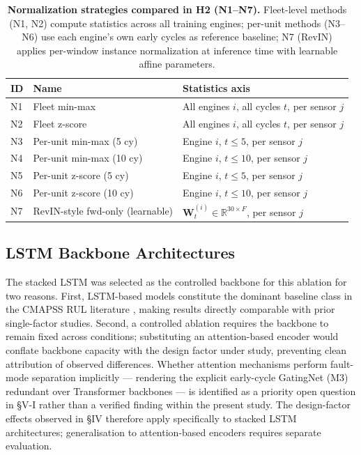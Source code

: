 \documentclass[preprint,10pt]{elsarticle}
\begin{document}
\begin{table}[!t]
\centering
\small
\caption*{\textbf{Normalization strategies compared in H2 (N1--N7).} Fleet-level methods (N1, N2) compute statistics across all training engines; per-unit methods (N3--N6) use each engine's own early cycles as reference baseline; N7 (RevIN) applies per-window instance normalization at inference time with learnable affine parameters.}
\label{tab:2}
\begin{tabular}{llp{5cm}}
\toprule
\textbf{ID} & \textbf{Name} & \textbf{Statistics axis} \\
\midrule
N1 & Fleet min-max & All engines $i$, all cycles $t$, per sensor $j$ \\
N2 & Fleet z-score & All engines $i$, all cycles $t$, per sensor $j$ \\
N3 & Per-unit min-max (5 cy) & Engine $i$, $t \le 5$, per sensor $j$ \\
N4 & Per-unit min-max (10 cy) & Engine $i$, $t \le 10$, per sensor $j$ \\
N5 & Per-unit z-score (5 cy) & Engine $i$, $t \le 5$, per sensor $j$ \\
N6 & Per-unit z-score (10 cy) & Engine $i$, $t \le 10$, per sensor $j$ \\
N7 & RevIN-style fwd-only (learnable) & $\mathbf{W}_t^{(i)} \in \mathbb{R}^{30 \times F}$, per sensor $j$ \\
\bottomrule
\end{tabular}
\end{table}


\subsection{LSTM Backbone Architectures}

The stacked LSTM was selected as the controlled backbone for this ablation for two reasons. First, LSTM-based models constitute the dominant baseline class in the CMAPSS RUL literature \cite{ref05,ref06,ref09}, making results directly comparable with prior single-factor studies. Second, a controlled ablation requires the backbone to remain fixed across conditions; substituting an attention-based encoder would conflate backbone capacity with the design factor under study, preventing clean attribution of observed differences. Whether attention mechanisms perform fault-mode separation implicitly --- rendering the explicit early-cycle GatingNet (M3) redundant over Transformer backbones --- is identified as a priority open question in \S{}V-I rather than a verified finding within the present study. The design-factor effects observed in \S{}IV therefore apply specifically to stacked LSTM architectures; generalisation to attention-based encoders requires separate evaluation.
\end{document}
